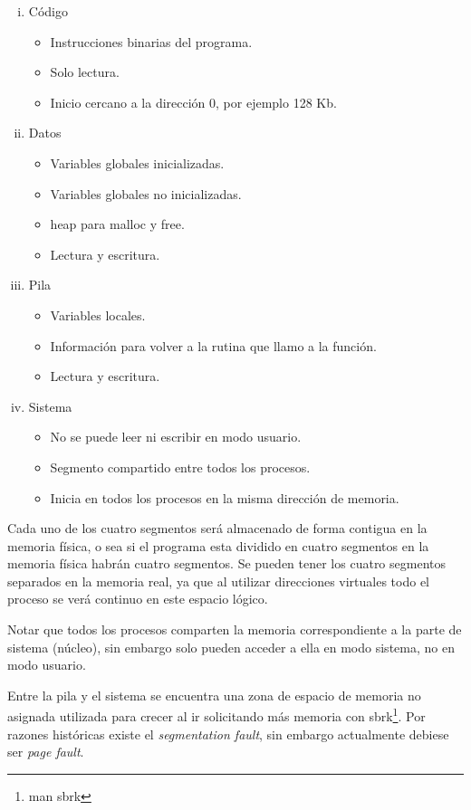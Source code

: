 \begin{enumerate}[i.]
	\item Código
	\begin{itemize}
		\item Instrucciones binarias del programa.
		\item Solo lectura.
		\item Inicio cercano a la dirección 0, por ejemplo 128 Kb.
	\end{itemize}
	\item Datos
		\begin{itemize}
			\item Variables globales inicializadas.
			\item Variables globales no inicializadas.
			\item heap para malloc y free.
			\item Lectura y escritura.
		\end{itemize}
	\item Pila
	\begin{itemize}
		\item Variables locales.
		\item Información para volver a la rutina que llamo a la
función.
		\item Lectura y escritura.
	\end{itemize}
	\item Sistema
	\begin{itemize}
		\item No se puede leer ni escribir en modo usuario.
		\item Segmento compartido entre todos los procesos.
		\item Inicia en todos los procesos en la misma dirección de
memoria.
	\end{itemize}
\end{enumerate}

Cada uno de los cuatro segmentos será almacenado de forma contigua en la memoria
física, o sea si el programa esta dividido en cuatro segmentos en la memoria
física habrán cuatro segmentos. Se pueden tener los cuatro segmentos separados
en la memoria real, ya que al utilizar direcciones virtuales todo el proceso se
verá continuo en este espacio lógico.

Notar que todos los procesos comparten la memoria correspondiente a la parte de
sistema (núcleo), sin embargo solo pueden acceder a ella en modo sistema, no en
modo usuario.

Entre la pila y el sistema se encuentra una zona de espacio de memoria no
asignada utilizada para crecer al ir solicitando más memoria con
sbrk\footnote{man sbrk}. Por razones históricas existe el \textit{segmentation
fault}, sin embargo actualmente debiese ser \textit{page fault}.

